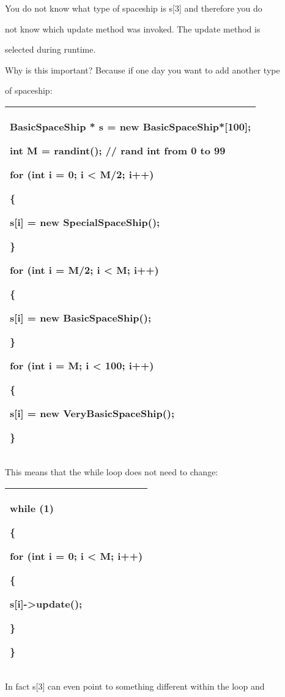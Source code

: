 \documentclass[
]{article}
\begin{document}
You do not know what type of spaceship is\textbf{ }s{[}3{]} and
therefore you do

not know which update method was invoked. The update method is

selected during runtime.

Why is this important? Because if one day you want to add another type

of spaceship:

\begin{longtable}[]{@{}l@{}}
\toprule
\endhead
\begin{minipage}[t]{0.97\columnwidth}\raggedright
BasicSpaceShip * s = new BasicSpaceShip*{[}100{]};

int M = randint(); // rand int from 0 to 99

for (int i = 0; i \textless{} M/2; i++)

\{

s{[}i{]} = new SpecialSpaceShip();

\}

for (int i = M/2; i \textless{} M; i++)

\{

s{[}i{]} = new BasicSpaceShip();

\}

for (int i = M; i \textless{} 100; i++)

\{

s{[}i{]} = new VeryBasicSpaceShip();

\}\strut
\end{minipage}\tabularnewline
\bottomrule
\end{longtable}

This means that the while loop does not need to change:

\begin{longtable}[]{@{}l@{}}
\toprule
\endhead
\begin{minipage}[t]{0.97\columnwidth}\raggedright
while (1)

\{

for (int i = 0; i \textless{} M; i++)

\{

s{[}i{]}-\textgreater update();

\}

\}\strut
\end{minipage}\tabularnewline
\bottomrule
\end{longtable}

In fact s{[}3{]} can even point to something different within the loop
and
\end{document}
